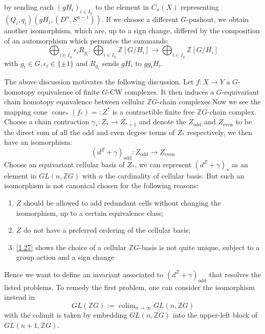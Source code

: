 \documentclass[11pt]{report}
\theoremstyle{definition}
\theoremstyle{plain}
\DeclareMathOperator{\cone}{cone}
\DeclareMathOperator{\colim}{colim}
\newcommand{\integer}{\mathbb{Z}}
\newcommand{\even}{\mathrm{even}}
\newcommand{\odd}{\mathrm{odd}}
\begin{document}
by sending each $(gH_i)_{i\in I_n}$ to the element in $C_n(X)$ representing $(Q_i, q_i)(gH_i, (D^n, S^{n-1}))$. If we choose a different $G$-pushout, we obtain another isomorphism, which are, up to a sign change, differed by the composition of an automorphism which permutes the summands:
\begin{equation}\label{1.27}
\bigoplus_{i\in I_n}\epsilon_i R_{g_i}:\bigoplus_{i\in I_n}\integer [G/H_i] \longrightarrow \bigoplus_{i\in I_n} \integer[G/H_i]
\end{equation}
with $g_i\in G, \epsilon_i\in \{\pm 1\}$ and $R_{g_i}$ sends $gH_i$ to $gg_iH_i$.
\par The above discussion motivates the following discussion. Let $f:X\to Y$ a $G$-homotopy equivalence of finite $G$-CW complexes. It then induces a $G$-equivariant chain homotopy equivalence between cellular $\integer G$-chain complexes.Now we see the mapping cone $\cone_*(f_*)=:Z^*$  is a contractible finite free $\integer G$-chain complex. Choose a chain contraction $\gamma_*:Z_*\to Z_{*+1}$ and denote the $Z_{\odd}$ and $Z_{\even}$ to be the direct sum of all the odd and even degree terms of $Z_*$ respectively, we then have an isomorphism:
\begin{equation}
(d^Z+\gamma)_{\odd}: Z_{\odd}\to Z_{\even}
\end{equation}
Choose an equivariant cellular basis of $Z_*$, we can represent $(d^Z+\gamma)_*$ as an element in $GL(n, \integer G)$ with $n$ the cardinality of cellular basis. But such an isomorphism is not canonical chosen for the following reasons:
\begin{enumerate}
	\item $Z$ should be allowed to add redundant cells without changing the isomorphism, up to a certain equivalence class;
	\item $Z$ do not have a preferred ordering of the cellular basis;
	\item \ref{1.27} shows the choice of a cellular $\integer G$-basis is not quite unique, subject to a group action and a sign change
\end{enumerate}
Hence we want to define an invariant associated to $(d^Z+\gamma)_{\odd}$ that resolves the listed problems. To remedy the first problem, one can consider the isomorphism instead in 
\begin{equation*}
GL(\integer G):=\colim_{n\to \infty}GL(n, \integer G)
\end{equation*}
with the colimit is taken by embedding $GL(n, \integer G)$ into the upper-left block of $GL(n+1, \integer G)$.
\end{document}

